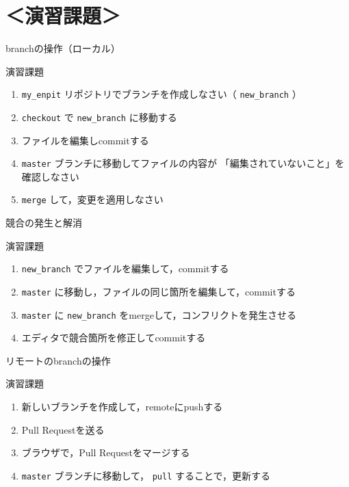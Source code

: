 \documentclass[t, aspectratio=169]{beamer}
\begin{document}
\section{＜演習課題＞}
\label{sec-3-5}
\begin{frame}[fragile,label=sec-3-5-1]{branchの操作（ローカル）}
 \begin{block}{演習課題}
\begin{enumerate}
\item \texttt{my\_enpit} リポジトリでブランチを作成しなさい（ \texttt{new\_branch} ）
\item \texttt{checkout} で \texttt{new\_branch} に移動する
\item ファイルを編集しcommitする
\item \texttt{master} ブランチに移動してファイルの内容が
「編集されていないこと」を確認しなさい
\item \texttt{merge} して，変更を適用しなさい
\end{enumerate}
\end{block}
\end{frame}

\begin{frame}[fragile,label=sec-3-5-2]{競合の発生と解消}
 \begin{block}{演習課題}
\begin{enumerate}
\item \texttt{new\_branch} でファイルを編集して，commitする
\item \texttt{master} に移動し，ファイルの同じ箇所を編集して，commitする
\item \texttt{master} に \texttt{new\_branch} をmergeして，コンフリクトを発生させる
\item エディタで競合箇所を修正してcommitする
\end{enumerate}
\end{block}
\end{frame}

\begin{frame}[fragile,label=sec-3-5-3]{リモートのbranchの操作}
 \begin{block}{演習課題}
\begin{enumerate}
\item 新しいブランチを作成して，remoteにpushする
\item Pull Requestを送る
\item ブラウザで，Pull Requestをマージする
\item \texttt{master} ブランチに移動して， \texttt{pull} することで，更新する
\end{enumerate}
\end{block}
\end{frame}
\end{document}
